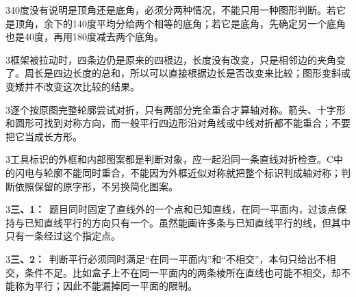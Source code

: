 \documentclass[multi=snippet,border={5bp 20bp 5bp 5bp}]{standalone}
\newenvironment{snippet}[3]{\begin{minipage}{#1bp}\color{answerred}\fontsize{#2}{#3}\selectfont\raggedright}{\end{minipage}}
\begin{document}
\begin{snippet}{505}{11.5}{14}\begin{multicols}{3}\raggedcolumns 40度没有说明是顶角还是底角，必须分两种情况，不能只用一种图形判断。若它是顶角，余下的140度平均分给两个相等的底角；若它是底角，先确定另一个底角也是40度，再用180度减去两个底角。\end{multicols}\end{snippet}
\begin{snippet}{505}{11.5}{14}\begin{multicols}{3}\raggedcolumns 框架被拉动时，四条边仍是原来的四根边，长度没有改变，只是相邻边的夹角变了。周长是四边长度的总和，所以可以直接根据边长是否改变来比较；图形变斜或变矮并不改变这次比较的结果。\end{multicols}\end{snippet}
\begin{snippet}{505}{11.5}{14}\begin{multicols}{3}\raggedcolumns 逐个按原图完整轮廓尝试对折，只有两部分完全重合才算轴对称。箭头、十字形和圆形可找到对称方向，而一般平行四边形沿对角线或中线对折都不能重合；不要把它当成长方形。\end{multicols}\end{snippet}
\begin{snippet}{505}{11.5}{14}\begin{multicols}{3}\raggedcolumns 工具标识的外框和内部图案都是判断对象，应一起沿同一条直线对折检查。C中的闪电与轮廓不能同时重合，不能因为外框近似对称就把整个标识判成轴对称；判断依照保留的原字形，不另换简化图案。\end{multicols}\end{snippet}
\begin{snippet}{505}{11.5}{14}\begin{multicols}{3}\raggedcolumns \textbf{三、1：}\ 题目同时固定了直线外的一个点和已知直线，在同一平面内，过该点保持与已知直线平行的方向只有一个。虽然能画许多条与已知直线平行的线，但其中只有一条经过这个指定点。\end{multicols}\end{snippet}
\begin{snippet}{505}{11.5}{14}\begin{multicols}{3}\raggedcolumns \textbf{三、2：}\ 判断平行必须同时满足“在同一平面内”和“不相交”，本句只给出不相交，条件不足。比如盒子上不在同一平面内的两条棱所在直线也可能不相交，却不能称为平行；因此不能漏掉同一平面的限制。\end{multicols}\end{snippet}
\end{document}
